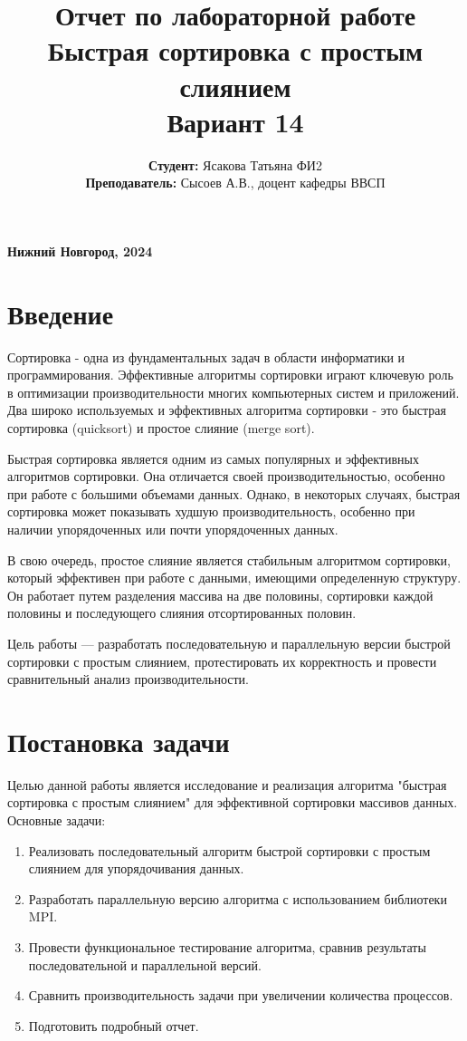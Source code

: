 \documentclass[a4paper,12pt]{article}
\title{
\vspace{4cm}
\textbf{\Large Отчет по лабораторной работе}\\[1cm]
\textbf{\Large Быстрая сортировка с простым слиянием} \\[1cm]
\textbf{\Large Вариант 14}\\[5cm]
}
\author{
\textbf{Студент:} Ясакова Татьяна ФИ2\\[0.2cm]
\textbf{Преподаватель:} Сысоев А.В., доцент кафедры ВВСП \\[5cm]
}
\date{}
\begin{document}
\maketitle
\vfill
\begin{center}
\textbf{\normalsize Нижний Новгород, 2024}
\end{center}

\newpage

\section*{\centering Введение}

Сортировка - одна из фундаментальных задач в области информатики и программирования. Эффективные алгоритмы сортировки играют ключевую роль в оптимизации производительности многих компьютерных систем и приложений. Два широко используемых и эффективных алгоритма сортировки - это быстрая сортировка (quicksort) и простое слияние (merge sort).

Быстрая сортировка является одним из самых популярных и эффективных алгоритмов сортировки. Она отличается своей производительностью, особенно при работе с большими объемами данных. Однако, в некоторых случаях, быстрая сортировка может показывать худшую производительность, особенно при наличии упорядоченных или почти упорядоченных данных.

В свою очередь, простое слияние является стабильным алгоритмом сортировки, который эффективен при работе с данными, имеющими определенную структуру. Он работает путем разделения массива на две половины, сортировки каждой половины и последующего слияния отсортированных половин.

Цель работы — разработать последовательную и параллельную версии быстрой сортировки с простым слиянием, протестировать их корректность и провести сравнительный анализ производительности.

\newpage

\section*{\centering Постановка задачи}

Целью данной работы является исследование и реализация алгоритма "быстрая сортировка с простым слиянием" для эффективной сортировки массивов данных.
Основные задачи:
\begin{enumerate}
    \item Реализовать последовательный алгоритм быстрой сортировки с простым слиянием для упорядочивания данных.
    \item Разработать параллельную версию алгоритма с использованием библиотеки MPI.
    \item Провести функциональное тестирование алгоритма, сравнив результаты последовательной и параллельной версий.
    \item Сравнить производительность задачи при увеличении количества процессов.
    \item Подготовить подробный отчет.
\end{enumerate}
\end{document}
